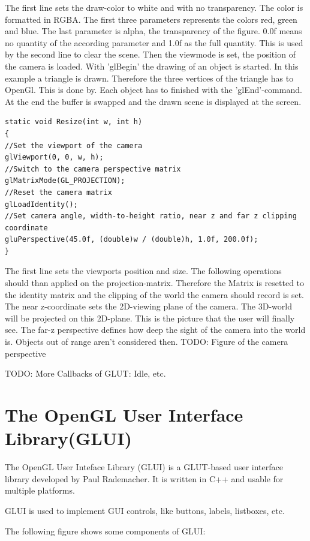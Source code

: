 \documentclass[10pt,a4paper,DIV=11]{scrreprt}
\begin{document}
The first line sets the draw-color to white and with no transparency. The color is formatted in RGBA. The first three parameters represents the colors red, green and blue. The last parameter is alpha, the transparency of the figure. 0.0f means no quantity of the according parameter and 1.0f as the full quantity.
 This is used by the second line to clear the scene.
Then the viewmode is set, the position of the camera is loaded.
With 'glBegin' the drawing of an object is started. In this example a triangle is drawn. Therefore the three vertices of the triangle has to OpenGl. This is done by. Each object has to finished with the 'glEnd'-command.
At the end the buffer is swapped and the drawn scene is displayed at the screen.

\begin{lstlisting}[caption={Resize camera perspective on window resize},label=lst:glut-resize]
static void Resize(int w, int h)
{
//Set the viewport of the camera
glViewport(0, 0, w, h);
//Switch to the camera perspective matrix
glMatrixMode(GL_PROJECTION); 
//Reset the camera matrix
glLoadIdentity();
//Set camera angle, width-to-height ratio, near z and far z clipping coordinate
gluPerspective(45.0f, (double)w / (double)h, 1.0f, 200.0f);
}
\end{lstlisting}

The first line sets the viewports position and size. The following operations should than applied on the projection-matrix. Therefore the Matrix is resetted to the identity matrix and the clipping of the world the camera should record is set. The near z-coordinate sets the 2D-viewing plane of the camera. The 3D-world will be projected on this 2D-plane. This is the picture that the user will finally see. The far-z perspective defines how deep the sight of the camera into the world is. Objects out of range aren't considered then.
TODO: Figure of the camera perspective

TODO: More Callbacks of GLUT: Idle, etc.

\section{The OpenGL User Interface Library(GLUI)}
The OpenGL User Inteface Library (GLUI) is a GLUT-based user interface library developed by Paul Rademacher. It is written in C++ and usable for multiple platforms.

GLUI is used to implement GUI controls, like buttons, labels, listboxes, etc.

The following figure shows some components of GLUI:
\end{document}
